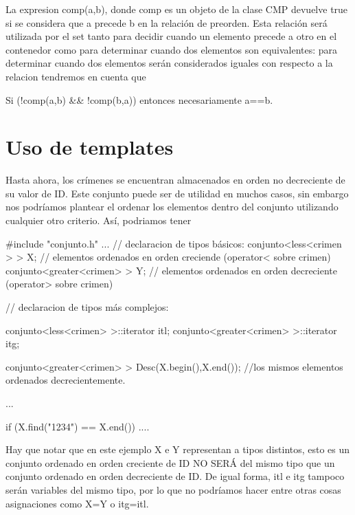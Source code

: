 La expresion comp(a,b), donde comp es un objeto de la clase C\-M\-P devuelve true si se considera que a precede b en la relación de preorden. Esta relación será utilizada por el set tanto para decidir cuando un elemento precede a otro en el contenedor como para determinar cuando dos elementos son equivalentes\-: para determinar cuando dos elementos serán considerados iguales con respecto a la relacion tendremos en cuenta que \begin{DoxyItemize}
\item Si (!comp(a,b) \&\& !comp(b,a)) entonces necesariamente a==b.\end{DoxyItemize}
\hypertarget{index_platillas}{}\section{Uso de templates}\label{index_platillas}
Hasta ahora, los crímenes se encuentran almacenados en orden no decreciente de su valor de I\-D. Este conjunto puede ser de utilidad en muchos casos, sin embargo nos podríamos plantear el ordenar los elementos dentro del conjunto utilizando cualquier otro criterio. Así, podriamos tener


\begin{DoxyCode}
\textcolor{preprocessor}{#include "conjunto.h"}
...
\textcolor{comment}{// declaracion de tipos básicos:}
conjunto<less<crimen > > X;  \textcolor{comment}{// elementos ordenados en orden creciende  (operator< sobre crimen)}
conjunto<greater<crimen> > Y; \textcolor{comment}{// elementos ordenados en orden decreciente (operator> sobre crimen)}

\textcolor{comment}{// declaracion de tipos más complejos:}

conjunto<less<crimen> >::iterator itl;
conjunto<greater<crimen> >::iterator itg;

conjunto<greater<crimen> > Desc(X.begin(),X.end()); \textcolor{comment}{//los mismos elementos ordenados decrecientemente.}

... 

\textcolor{keywordflow}{if} (X.find(\textcolor{stringliteral}{"1234"}) == X.end()) 
   ....
\end{DoxyCode}


Hay que notar que en este ejemplo X e Y representan a tipos distintos, esto es un conjunto ordenado en orden creciente de I\-D N\-O S\-E\-RÁ del mismo tipo que un conjunto ordenado en orden decreciente de I\-D. De igual forma, itl e itg tampoco serán variables del mismo tipo, por lo que no podríamos hacer entre otras cosas asignaciones como X=Y o itg=itl.

